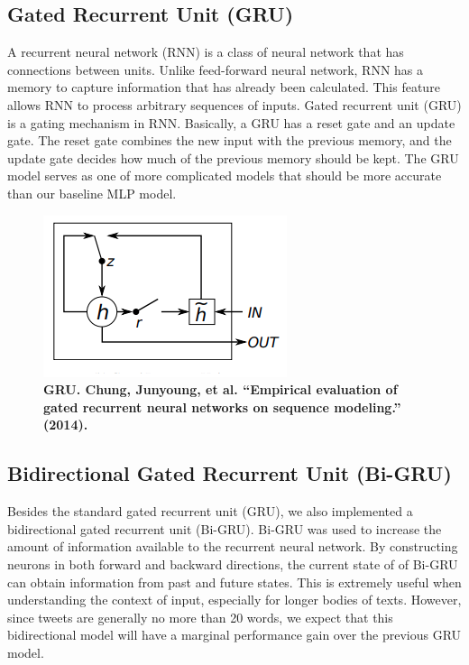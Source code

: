 \documentclass[11pt,a4paper]{article}
\begin{document}
	
	
	
	\subsection{Gated Recurrent Unit (GRU)}
	A recurrent neural network (RNN) is a class of neural network that has connections between units. Unlike feed-forward neural network, RNN has a memory to capture information that has already been calculated. This feature allows RNN to process arbitrary sequences of inputs. Gated recurrent unit (GRU) is a gating mechanism in RNN. Basically, a GRU has a reset gate and an update gate. The reset gate combines the new input with the previous memory, and the update gate decides how much of the previous memory should be kept. The GRU model serves as one of more complicated models that should be more accurate than our baseline MLP model.
	\begin{figure}[H]
		\hspace*{-1.3cm}
		\centering\includegraphics[scale=0.7]{gru} 
		\caption{\textbf{ GRU. Chung, Junyoung, et al. “Empirical evaluation of gated recurrent neural networks on sequence modeling.” (2014).}}
	\end{figure}

	
	
	
	\subsection{Bidirectional Gated Recurrent Unit (Bi-GRU)}
	\label{sect:pdf}
	
	Besides the standard gated recurrent unit (GRU), we also implemented a bidirectional gated recurrent unit (Bi-GRU). Bi-GRU was used to increase the amount of information available to the recurrent neural network. By constructing neurons in both forward and backward directions, the current state of of Bi-GRU can obtain information from past and future states. This is extremely useful when understanding the context of input, especially for longer bodies of texts. However, since tweets are generally no more than 20 words, we expect that this bidirectional model will have a marginal performance gain over the previous GRU model.
	
\end{document}
